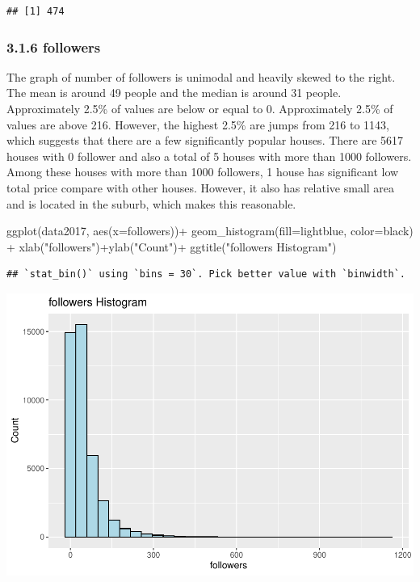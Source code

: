 \documentclass[
]{article}
\newenvironment{Shaded}{\begin{snugshade}}{\end{snugshade}}
\newcommand{\AttributeTok}[1]{\textcolor[rgb]{0.77,0.63,0.00}{#1}}
\newcommand{\FunctionTok}[1]{\textcolor[rgb]{0.00,0.00,0.00}{#1}}
\newcommand{\NormalTok}[1]{#1}
\newcommand{\SpecialCharTok}[1]{\textcolor[rgb]{0.00,0.00,0.00}{#1}}
\newcommand{\StringTok}[1]{\textcolor[rgb]{0.31,0.60,0.02}{#1}}
\begin{document}
\begin{verbatim}
## [1] 474
\end{verbatim}

\hypertarget{followers}{%
\subsubsection{3.1.6 followers}\label{followers}}

The graph of number of followers is unimodal and heavily skewed to the
right. The mean is around 49 people and the median is around 31 people.
Approximately 2.5\% of values are below or equal to 0. Approximately
2.5\% of values are above 216. However, the highest 2.5\% are jumps from
216 to 1143, which suggests that there are a few significantly popular
houses. There are 5617 houses with 0 follower and also a total of 5
houses with more than 1000 followers. Among these houses with more than
1000 followers, 1 house has significant low total price compare with
other houses. However, it also has relative small area and is located in
the suburb, which makes this reasonable.

\begin{Shaded}
\begin{Highlighting}[]
\FunctionTok{ggplot}\NormalTok{(data2017, }\FunctionTok{aes}\NormalTok{(}\AttributeTok{x=}\NormalTok{followers))}\SpecialCharTok{+}
  \FunctionTok{geom\_histogram}\NormalTok{(}\AttributeTok{fill=}\StringTok{\textquotesingle{}lightblue\textquotesingle{}}\NormalTok{, }\AttributeTok{color=}\StringTok{\textquotesingle{}black\textquotesingle{}}\NormalTok{) }\SpecialCharTok{+}
  \FunctionTok{xlab}\NormalTok{(}\StringTok{"followers"}\NormalTok{)}\SpecialCharTok{+}\FunctionTok{ylab}\NormalTok{(}\StringTok{"Count"}\NormalTok{)}\SpecialCharTok{+}
  \FunctionTok{ggtitle}\NormalTok{(}\StringTok{"followers Histogram"}\NormalTok{)}
\end{Highlighting}
\end{Shaded}

\begin{verbatim}
## `stat_bin()` using `bins = 30`. Pick better value with `binwidth`.
\end{verbatim}

\includegraphics{Project_files/figure-latex/unnamed-chunk-14-1.pdf}
\end{document}
